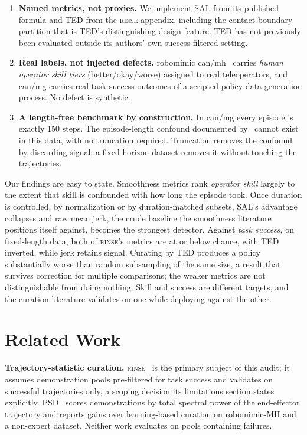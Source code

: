 \documentclass[10pt]{article}
\newcommand{\rinse}{\textsc{rinse}}
\begin{document}
\begin{enumerate}
\item \textbf{Named metrics, not proxies.} We implement SAL from its
published formula and TED from the \rinse{} appendix, including the
contact-boundary partition that is TED's distinguishing design feature. TED
has not previously been evaluated outside its authors' own
success-filtered setting.
\item \textbf{Real labels, not injected defects.} robomimic
can/mh~\citep{robomimic} carries \emph{human operator skill tiers}
(better/okay/worse) assigned to real teleoperators, and can/mg carries real
task-success outcomes of a scripted-policy data-generation process. No defect
is synthetic.
\item \textbf{A length-free benchmark by construction.} In can/mg every
episode is exactly 150 steps. The episode-length confound documented
by~\citep{bedi-policy} cannot exist in this data, with no truncation
required. Truncation removes the confound by discarding signal; a
fixed-horizon dataset removes it without touching the trajectories.
\end{enumerate}

Our findings are easy to state. Smoothness metrics rank \emph{operator
skill} largely to the extent that skill is confounded with how long the
episode took. Once duration is controlled, by normalization or by
duration-matched subsets, SAL's advantage collapses and raw mean jerk, the
crude baseline the smoothness literature positions itself against, becomes
the strongest detector. Against \emph{task success}, on fixed-length data,
both of \rinse{}'s metrics are at or below chance, with TED inverted, while
jerk retains signal. Curating by TED produces a policy substantially worse
than random subsampling of the same size, a result that survives correction
for multiple comparisons; the weaker metrics are not distinguishable from
doing nothing. Skill and success are
different targets, and the curation literature validates on one while
deploying against the other.

\section{Related Work}

\textbf{Trajectory-statistic curation.} \rinse{}~\citep{rinse} is the primary
subject of this audit; it assumes demonstration pools pre-filtered for task
success and validates on successful trajectories only, a scoping decision its
limitations section states explicitly. PSD~\citep{psd} scores demonstrations
by total spectral power of the end-effector trajectory and reports gains over
learning-based curation on robomimic-MH and a non-expert dataset. Neither
work evaluates on pools containing failures.
\end{document}
